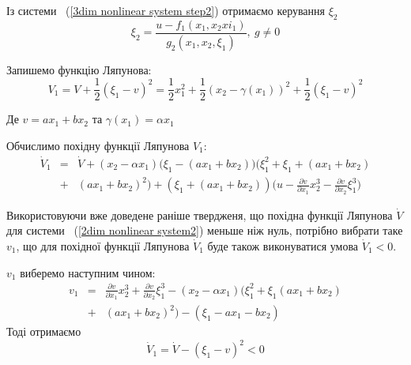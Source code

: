 \documentclass{article}
\begin{document}
Із системи ~(\ref{3dim nonlinear system step2}) отримаємо керування $\xi_2$ 
\begin{equation}
    \xi_2 = \frac{u-f_1(x_1,x_2xi_1)}{g_2(x_1,x_2,\xi_1)}, ~g \neq 0
\end{equation}

Запишемо функцію Ляпунова:
\begin{equation}
    V_1 = V+\frac{1}{2}(\xi_1-v)^2=\frac{1}{2}x_1^2+\frac{1}{2}(x_2-\gamma(x_1))^2+
    \frac{1}{2}(\xi_1-v)^2
\end{equation}

Де $v = ax_1+bx_2$ та $\gamma(x_1) = \alpha x_1$

Обчислимо похідну функції Ляпунова $V_1$:
\begin{eqnarray}
    \dot V_1 &=& \dot V + (x_2-\alpha x_1) \Big( \xi_1-(ax_1+bx_2) \Big)
    \Big( \xi_1^2+\xi_1+(ax_1+bx_2) \nonumber \\ &+&(ax_1+bx_2)^2 \Big)
    +(\xi_1+(ax_1+bx_2))
    \Big(u-\frac{\partial v}{\partial x_1}x_{2}^3 
    - \frac{\partial v}{\partial x_2}\xi_{1}^3 \Big)
\end{eqnarray}

Використовуючи вже доведене раніше твердженя, що похідна функції Ляпунова $\dot V$ для системи
 ~(\ref{2dim nonlinear system2})  меньше ніж нуль, потрібно вибрати таке $v_1$, що для похідної функції
Ляпунова $\dot V_1$ буде також виконуватися умова $\dot V_1 < 0$.

$v_1$ виберемо наступним чином:
\begin{eqnarray}
    v_1 &=& \frac{\partial v}{\partial x_1}x_{2}^3 + \frac{\partial v}{\partial x_2}\xi_{1}^3
    - (x_2 -\alpha x_1) \Big(\xi_1^2 + \xi_1(ax_1 + bx_2) \nonumber \\ 
    &+& (ax_1+bx_2)^2 \Big) -(\xi_1 - ax_1-bx_2)
\end{eqnarray}
Тоді отримаємо
\begin{equation}
    \dot V_1 = \dot V - (\xi_1 - v)^2<0
\end{equation}
\end{document}
